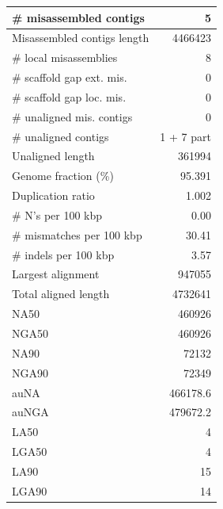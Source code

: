 \documentclass[12pt,a4paper]{article}
\begin{document}
\begin{table}[ht]
\begin{center}
\begin{tabular}{|l*{1}{|r}|}
\# misassembled contigs & 5 \\ \hline
Misassembled contigs length & 4466423 \\ \hline
\# local misassemblies & 8 \\ \hline
\# scaffold gap ext. mis. & 0 \\ \hline
\# scaffold gap loc. mis. & 0 \\ \hline
\# unaligned mis. contigs & 0 \\ \hline
\# unaligned contigs & 1 + 7 part \\ \hline
Unaligned length & 361994 \\ \hline
Genome fraction (\%) & 95.391 \\ \hline
Duplication ratio & 1.002 \\ \hline
\# N's per 100 kbp & 0.00 \\ \hline
\# mismatches per 100 kbp & 30.41 \\ \hline
\# indels per 100 kbp & 3.57 \\ \hline
Largest alignment & 947055 \\ \hline
Total aligned length & 4732641 \\ \hline
NA50 & 460926 \\ \hline
NGA50 & 460926 \\ \hline
NA90 & 72132 \\ \hline
NGA90 & 72349 \\ \hline
auNA & 466178.6 \\ \hline
auNGA & 479672.2 \\ \hline
LA50 & 4 \\ \hline
LGA50 & 4 \\ \hline
LA90 & 15 \\ \hline
LGA90 & 14 \\ \hline
\end{tabular}
\end{center}
\end{table}
\end{document}
